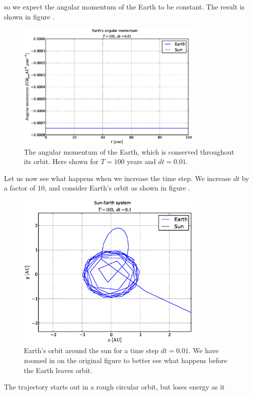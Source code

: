 so we expect the angular momentum of the Earth to be constant. The result is
shown in figure .
%
\begin{figure}[htpb]
	\centering
	\includegraphics[width=0.8\textwidth]{figures/earth_angmom_dt1e-2}
	\caption{The angular momentum of the Earth, which is conserved throughout
	its orbit. Here shown for $T = 100$ years and $dt = 0.01$.}
	\label{fig:angmom}
\end{figure}
%
Let us now see what happens when we increase the time step. We increase
$dt$ by a factor of $10$, and consider Earth's orbit as shown in figure
.
%
\begin{figure}[htpb]
	\centering
	\includegraphics[width=0.8\textwidth]{figures/sun_earth_T100_dt1e-1_zoom}
	\caption{Earth's orbit around the sun for a time step $dt = 0.01$. We have
	zoomed in on the original figure to better see what happens before the Earth
	leaves orbit.}
	\label{fig:sunEarth-dt0.1}
\end{figure}
%
The trajectory starts out in a rough circular orbit, but loses energy as it
